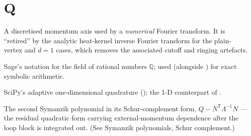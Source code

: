 \section*{Q}
\begin{description}[leftmargin=0pt,style=nextline]

  \item[\code{q}-grid] A discretised momentum axis used by a \emph{numerical} Fourier
        transform. It is ``retired'' by the analytic heat-kernel inverse Fourier
        transform for the plain-vertex and $d=1$ cases, which removes the associated
        cutoff and ringing artefacts.

  \item[\code{QQ}] Sage's notation for the field of rational numbers $\mathbb{Q}$;
        used (alongside ) for exact symbolic arithmetic.

  \item[\code{quad}] SciPy's adaptive one-dimensional quadrature
        (); the 1-D counterpart of .

  \item[$Q_{\mathrm{eff}}$] The second Symanzik polynomial in its Schur-complement
        form, $Q-N^{\mathsf T}\Lambda^{-1}N$ --- the residual quadratic form carrying
        external-momentum dependence after the loop block is integrated out. (See
        Symanzik polynomials, Schur complement.)

\end{description}

